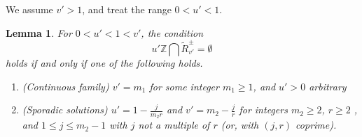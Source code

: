 \documentclass[12pt,letterpaper, reqno]{amsart}
\newtheorem{lem}[thm]{Lemma}
\theoremstyle{definition}
\theoremstyle{remark}
\newcommand{\ZZ}{\ensuremath{\mathbb{Z}}}
\newcommand{\uu}{{u'}}
\newcommand{\vv}{{v'}}
\begin{document}
We assume ${\vv} >1$, and treat the range $0 < {\uu} <1$.
\begin{lem}\label{lem:53aa}
For $0<\uu<1<\vv$, 
the condition
$${\uu}\ZZ \bigcap \widetilde{R}_\vv^{\pm} = \emptyset$$
holds if and only if one of the following holds.
\begin{enumerate}
\item[(a)]   (Continuous family) $\vv=m_1$ for some integer $m_1 \ge 1$, and $\uu>0$ arbitrary
\item[(b)] (Sporadic solutions) $\uu= 1-\frac{j}{m_2r}$ and  $\vv=m_2- \frac{j}{r}$ 
for integers $m_2 \ge 2$,   $r \ge 2$ , and $1\le j\le m_2-1$ with $j$ not a multiple of $r$ (or, with $(j,r)$ coprime).
\end{enumerate}
\end{lem}
\end{document}

